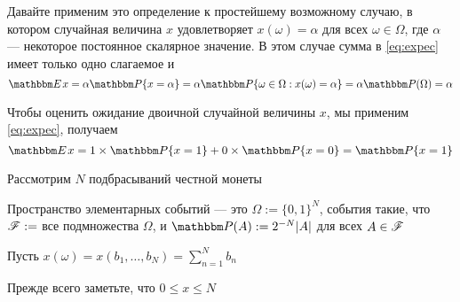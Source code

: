\begin{frame}

    \vspace{2em}
    \Eg
    Давайте применим это определение к простейшему возможному случаю, в котором
    случайная величина $x$ удовлетворяет $x(\omega) = \alpha$ для всех $\omega \in
    \Omega$, где $\alpha$ --- некоторое постоянное скалярное значение. В этом случае
    сумма в \eqref{eq:expec} имеет только одно слагаемое и 
    \begin{equation*}
        \EE x
        = \alpha \PP\{x = \alpha\} 
        = \alpha \PP\setntn{\omega \in \Omega}{x(\omega) = \alpha} 
        = \alpha \PP(\Omega) 
        = \alpha
    \end{equation*}
    
\end{frame}

\begin{frame}

    \vspace{2em}
    \Eg
    Чтобы оценить ожидание двоичной случайной величины $x$,
    мы применим \eqref{eq:expec}, получаем
    \begin{equation*}
        \label{eq:expbin}
        \EE x  = 1 \times \PP\{x=1\} + 0 \times \PP\{x = 0\} = \PP\{x=1\}
    \end{equation*}
\end{frame}

\begin{frame}

    \vspace{2em}
    \Eg
    Рассмотрим $N$ подбрасываний честной монеты
    
    Пространство элементарных событий --- это $\Omega := \{0, 1\}^N$, 
    события такие, что $\mathscr F :=$  все подмножества $\Omega$, и $\PP(A) := 2^{-N} |A|$ для
    всех $A \in \mathscr F$
    
    Пусть 
        $x(\omega) = x(b_1, \ldots, b_N) = \sum_{n=1}^N b_n$
        
    
    Прежде всего заметьте, что $0
    \leq x \leq N$
    
\end{frame}

